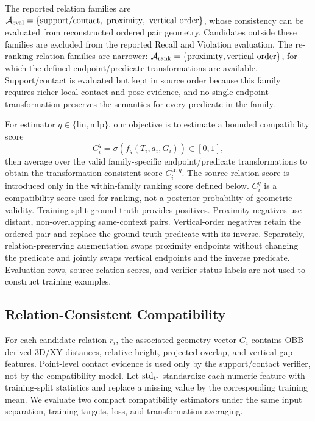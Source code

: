 The reported relation families are 
$\mathcal{A}_{\rm eval}=\{\mathrm{support/contact},\ \mathrm{proximity},\ \mathrm{vertical\ order}\}$, 
whose consistency can be evaluated from reconstructed ordered pair geometry. Candidates outside these families are excluded from the reported Recall and Violation evaluation. The re-ranking relation families are narrower: $\mathcal A_{\rm rank}=\{\mathrm{proximity},\mathrm{vertical\ order}\}$, for which the defined endpoint/predicate transformations are available. Support/contact is evaluated but kept in source order because this family requires richer local contact and pose evidence, and no single endpoint transformation preserves the semantics for every predicate in the family. 

For estimator $q\in\{\mathrm{lin},\mathrm{mlp}\}$, our objective is to estimate a bounded compatibility score
\begin{equation}
C_i^q=\sigma\!\left(f_q(T_i,a_i,G_i)\right)\in[0,1],
\end{equation}
then average over the valid family-specific endpoint/predicate transformations to obtain the transformation-consistent score $C_i^{\mathrm{tr},q}$. The source relation score is introduced only in the within-family ranking score defined below. $C_i^q$ is a compatibility score used for ranking, not a posterior probability of geometric validity. Training-split ground truth provides positives. Proximity negatives use distant, non-overlapping same-context pairs. Vertical-order negatives retain the ordered pair and replace the ground-truth predicate with its inverse. 
Separately, relation-preserving augmentation swaps proximity endpoints without changing the predicate and jointly swaps vertical endpoints and the inverse predicate. Evaluation rows, source relation scores, and verifier-status labels are not used to construct training examples. 

\subsection{Relation-Consistent Compatibility}
\label{sec:Compatibility}
For each candidate relation $r_i$, the associated geometry vector $G_i$ contains OBB-derived 3D/XY distances, relative height, projected overlap, and vertical-gap features. Point-level contact evidence is used only by the support/contact verifier, not by the compatibility model. Let $\operatorname{std}_{\rm tr}$ standardize each numeric feature with training-split statistics and replace a missing value by the corresponding training mean. We evaluate two compact compatibility estimators under the same input separation, training targets, loss, and transformation averaging. 


